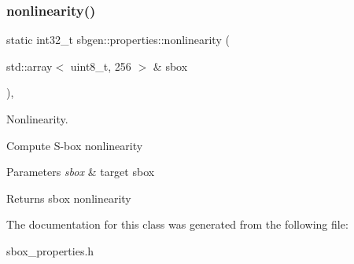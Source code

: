 \subsubsection{\texorpdfstring{nonlinearity()}{nonlinearity()}}
{\footnotesize\ttfamily static int32\+\_\+t sbgen\+::properties\+::nonlinearity (\begin{DoxyParamCaption}\item[{std\+::array$<$ uint8\+\_\+t, 256 $>$ \&}]{sbox }\end{DoxyParamCaption})\hspace{0.3cm}{\ttfamily [inline]}, {\ttfamily [static]}}



Nonlinearity. 

Compute S-\/box nonlinearity


\begin{DoxyParams}{Parameters}
{\em sbox} & target sbox \\
\hline
\end{DoxyParams}
\begin{DoxyReturn}{Returns}
sbox nonlinearity 
\end{DoxyReturn}


The documentation for this class was generated from the following file\+:\begin{DoxyCompactItemize}
\item 
sbox\+\_\+properties.\+h\end{DoxyCompactItemize}
